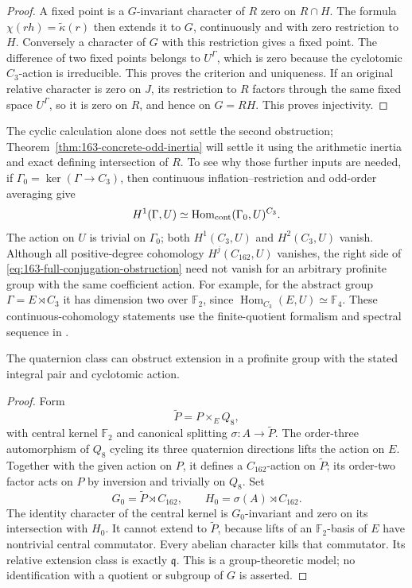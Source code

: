 \begin{proof}
A fixed point is a \(G\)-invariant character of \(R\)
zero on \(R\cap H\). The formula
\(\chi(rh)=\widetilde\kappa(r)\) then extends it to
\(G\), continuously and with zero restriction to \(H\).
Conversely a character of \(G\) with this restriction
gives a fixed point. The difference of two fixed points
belongs to \(U^\Gamma\), which is zero because the
cyclotomic \(C_3\)-action is irreducible.
This proves the criterion and uniqueness.
If an original relative character is zero on \(J\),
its restriction to \(R\) factors through the same
fixed space \(U^\Gamma\), so it is zero on \(R\),
and hence on \(G=RH\). This proves injectivity.
\end{proof}

The cyclic calculation alone does not settle the second obstruction;
Theorem~\ref{thm:163-concrete-odd-inertia} will settle it using the
arithmetic inertia and exact defining intersection of \(R\). To see why
those further inputs are needed, if
\(\Gamma_0=\ker(\Gamma\to C_3)\), then continuous
inflation--restriction and odd-order averaging give
\begin{equation}
 H^1(\Gamma,U)
   \simeq\operatorname{Hom}_{\rm cont}(\Gamma_0,U)^{C_3}.
 \label{eq:163-full-conjugation-obstruction}
\end{equation}
The action on \(U\) is trivial on \(\Gamma_0\);
both \(H^1(C_3,U)\) and \(H^2(C_3,U)\) vanish.
Although all positive-degree cohomology
\(H^j(C_{162},U)\) vanishes, the right side of
\eqref{eq:163-full-conjugation-obstruction} need not vanish for an
arbitrary profinite group with the same coefficient action.
For example, for the abstract group
\(\Gamma=E\rtimes C_3\) it has dimension two over
\(\mathbb F_2\), since
\(\operatorname{Hom}_{C_3}(E,U)\simeq\mathbb F_4\).
These continuous-cohomology statements use the
finite-quotient formalism and spectral sequence in
\cite[II, Remark~1.35 and Proposition~4.2]{MilneCFT}.

\begin{proposition}
\label{prop:163-central-obstruction-model}
The quaternion class can obstruct extension in a
profinite group with the stated integral pair and
cyclotomic action.
\end{proposition}
\begin{proof}
Form
\[
 \widetilde P=P\times_E Q_8,
\]
with central kernel \(\mathbb F_2\) and canonical
splitting \(\sigma:A\to\widetilde P\).
The order-three automorphism of \(Q_8\) cycling its
three quaternion directions lifts the action on \(E\).
Together with the given action on \(P\), it defines
a \(C_{162}\)-action on \(\widetilde P\); its
order-two factor acts on \(P\) by inversion and
trivially on \(Q_8\).
Set
\[
 G_0=\widetilde P\rtimes C_{162},\qquad
 H_0=\sigma(A)\rtimes C_{162}.
\]
The identity character of the central kernel is
\(G_0\)-invariant and zero on its intersection with
\(H_0\). It cannot extend to \(\widetilde P\),
because lifts of an \(\mathbb F_2\)-basis of \(E\)
have nontrivial central commutator. Every abelian
character kills that commutator.
Its relative extension class is exactly
\(\mathfrak q\). This is a group-theoretic model;
no identification with a quotient or subgroup
of \(G\) is asserted.
\end{proof}
